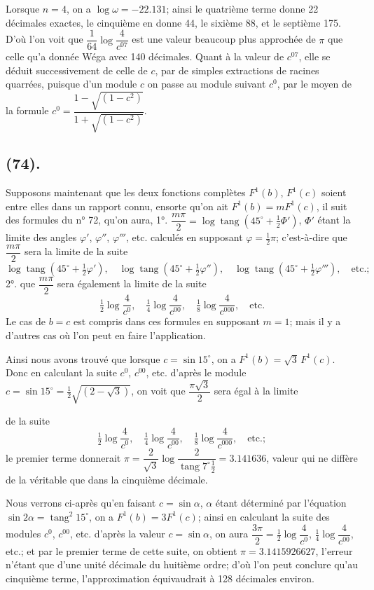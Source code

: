 \documentclass{article}
\begin{document}
Lorsque $n=4$, on a $\log\omega=-22.131$; ainsi le quatrième terme donne 22 décimales exactes, le cinquième en donne 44, le sixième 88, et le septième 175. D'où l'on voit que $\dfrac{1}{64}\log\dfrac{4}{c^{07}}$ est une valeur beaucoup plus approchée de $\pi$ que celle qu'a donnée Wéga avec 140 décimales. Quant à la valeur de $c^{07}$, elle se déduit successivement de celle de $c$, par de simples extractions de racines quarrées, puisque d'un module $c$ on passe au module suivant $c^{0}$, par le moyen de la formule $c^{0}=\dfrac{1-\sqrt{(1-c^{2})}}{1+\sqrt{(1-c^{2})}}$.

\subsection*{(74).}

Supposons maintenant que les deux fonctions complètes $F^{1}(b)$, $F^{1}(c)$ soient entre elles dans un rapport connu, ensorte qu'on ait $F^{1}(b)=mF^{1}(c)$, il suit des formules du n° 72, qu'on aura, 1°. $\dfrac{m\pi}{2}=\log\operatorname{tang}(45^{\circ}+\frac{1}{2}\Phi')$, $\Phi'$ étant la limite des angles $\varphi'$, $\varphi''$, $\varphi'''$, etc. calculés en supposant $\varphi=\frac{1}{2}\pi$; c'est-à-dire que $\dfrac{m\pi}{2}$ sera la limite de la suite
\[ \log\operatorname{tang}(45^{\circ}+\tfrac{1}{2}\varphi'),\quad \log\operatorname{tang}(45^{\circ}+\tfrac{1}{2}\varphi''),\quad \log\operatorname{tang}(45^{\circ}+\tfrac{1}{2}\varphi'''),\quad \text{etc.}; \]
2°. que $\dfrac{m\pi}{2}$ sera également la limite de la suite
\[ \tfrac{1}{2}\log\frac{4}{c^{0}},\quad \tfrac{1}{4}\log\frac{4}{c^{00}},\quad \tfrac{1}{8}\log\frac{4}{c^{000}},\quad \text{etc.} \]
Le cas de $b=c$ est compris dans ces formules en supposant $m=1$; mais il y a d'autres cas où l'on peut en faire l'application.

Ainsi nous avons trouvé que lorsque $c=\sin15^{\circ}$, on a $F^{1}(b)=\sqrt{3}\,F^{1}(c)$. Donc en calculant la suite $c^{0}$, $c^{00}$, etc. d'après le module $c=\sin15^{\circ}=\frac{1}{2}\sqrt{(2-\sqrt{3})}$, on voit que $\dfrac{\pi\sqrt{3}}{2}$ sera égal à la limite

de la suite
\[ \tfrac{1}{2}\log\frac{4}{c^{0}},\quad \tfrac{1}{4}\log\frac{4}{c^{00}},\quad \tfrac{1}{8}\log\frac{4}{c^{000}},\quad \text{etc.}; \]
le premier terme donnerait $\pi=\dfrac{2}{\sqrt{3}}\log\dfrac{2}{\operatorname{tang}7^{\circ}\frac{1}{2}}=3.141636$, valeur qui ne diffère de la véritable que dans la cinquième décimale.

Nous verrons ci-après qu'en faisant $c=\sin\alpha$, $\alpha$ étant déterminé par l'équation $\sin2\alpha=\operatorname{tang}^{2}15^{\circ}$, on a $F^{1}(b)=3F^{1}(c)$; ainsi en calculant la suite des modules $c^{0}$, $c^{00}$, etc. d'après la valeur $c=\sin\alpha$, on aura $\dfrac{3\pi}{2}=\frac{1}{2}\log\dfrac{4}{c^{0}}$, $\frac{1}{4}\log\dfrac{4}{c^{00}}$, etc.; et par le premier terme de cette suite, on obtient $\pi=3.1415926627$, l'erreur n'étant que d'une unité décimale du huitième ordre; d'où l'on peut conclure qu'au cinquième terme, l'approximation équivaudrait à 128 décimales environ.
\end{document}
